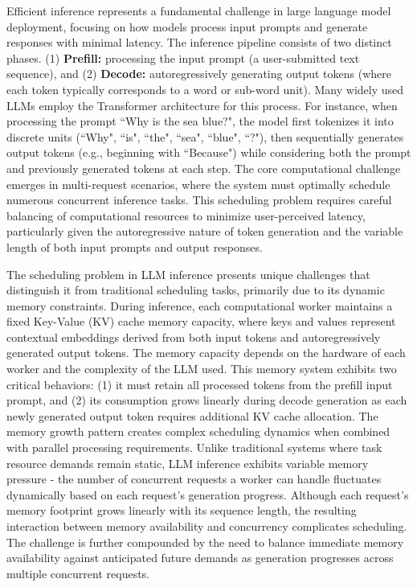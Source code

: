 \documentclass[nonblindrev]{informs3_hide}
\begin{document}
Efficient inference represents a fundamental challenge in large language model deployment, focusing on how models process input prompts and generate responses with minimal latency. The inference pipeline consists of two distinct phases. (1) \textbf{Prefill:} processing the input prompt (a user-submitted text sequence), and (2) \textbf{Decode:} autoregressively generating output tokens (where each token typically corresponds to a word or sub-word unit). Many widely used LLMs employ the Transformer architecture \citep{vaswani2017attention} for this process. For instance, when processing the prompt ``Why is the sea blue?", the model first tokenizes it into discrete units (``Why", ``is", ``the", ``sea", ``blue", ``?"), then sequentially generates output tokens (e.g., beginning with ``Because") while considering both the prompt and previously generated tokens at each step.
The core computational challenge emerges in multi-request scenarios, where the system must optimally schedule numerous concurrent inference tasks. This scheduling problem requires careful balancing of computational resources to minimize user-perceived latency, particularly given the autoregressive nature of token generation and the variable length of both input prompts and output responses.

The scheduling problem in LLM inference presents unique challenges that distinguish it from traditional scheduling tasks, primarily due to its dynamic memory constraints. During inference, each computational worker maintains a fixed Key-Value (KV) cache memory capacity, where keys and values represent contextual embeddings derived from both input tokens and autoregressively generated output tokens. The memory capacity depends on the hardware of each worker and the complexity of the LLM used. This memory system exhibits two critical behaviors: (1) it must retain all processed tokens from the prefill input prompt, and (2) its consumption grows linearly during decode generation as each newly generated output token requires additional KV cache allocation. The memory growth pattern creates complex scheduling dynamics when combined with parallel processing requirements. Unlike traditional systems where task resource demands remain static, LLM inference exhibits variable memory pressure - the number of concurrent requests a worker can handle fluctuates dynamically based on each request's generation progress. Although each request's memory footprint grows linearly with its sequence length, the resulting interaction between memory availability and concurrency complicates scheduling. The challenge is further compounded by the need to balance immediate memory availability against anticipated future demands as generation progresses across multiple concurrent requests.
\end{document}
